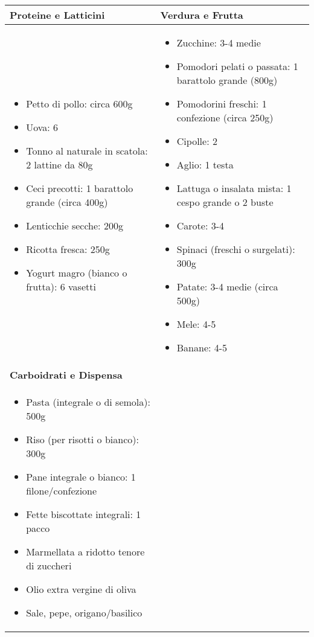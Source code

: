 \documentclass[a4paper, 11pt]{article}
\begin{document}
\begin{tabular}{@{}p{} p{}@{}}
\toprule
\textbf{Proteine e Latticini} & \textbf{Verdura e Frutta} \\
\midrule
\begin{itemize}[leftmargin=*]
    \item Petto di pollo: circa 600g
    \item Uova: 6
    \item Tonno al naturale in scatola: 2 lattine da 80g
    \item Ceci precotti: 1 barattolo grande (circa 400g)
    \item Lenticchie secche: 200g
    \item Ricotta fresca: 250g
    \item Yogurt magro (bianco o frutta): 6 vasetti
\end{itemize} & 
\begin{itemize}[leftmargin=*]
    \item Zucchine: 3-4 medie
    \item Pomodori pelati o passata: 1 barattolo grande (800g)
    \item Pomodorini freschi: 1 confezione (circa 250g)
    \item Cipolle: 2
    \item Aglio: 1 testa
    \item Lattuga o insalata mista: 1 cespo grande o 2 buste
    \item Carote: 3-4
    \item Spinaci (freschi o surgelati): 300g
    \item Patate: 3-4 medie (circa 500g)
    \item Mele: 4-5
    \item Banane: 4-5
\end{itemize} \\
\addlinespace[1em]
\bottomrule
\toprule
\textbf{Carboidrati e Dispensa} & \\
\midrule
\begin{itemize}[leftmargin=*]
    \item Pasta (integrale o di semola): 500g
    \item Riso (per risotti o bianco): 300g
    \item Pane integrale o bianco: 1 filone/confezione
    \item Fette biscottate integrali: 1 pacco
    \item Marmellata a ridotto tenore di zuccheri
    \item Olio extra vergine di oliva
    \item Sale, pepe, origano/basilico
\end{itemize} & \\
\bottomrule
\end{tabular}
\end{document}
